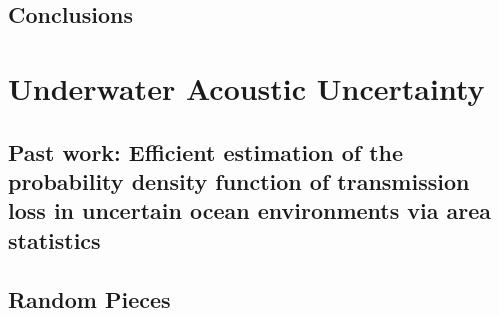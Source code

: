 \documentclass{./tex/thesis-umich}
\begin{document}
\acresetall

\chapter{Conclusions} \label{ch:usbe_conclusions}


\part{Underwater Acoustic Uncertainty} \label{part:uw_uncertainty}
\chapter{Past work: Efficient estimation of the probability density
  function of transmission loss in uncertain ocean environments via
  area statistics}
% 








\appendix
\begin{appendices}
  \chapter{Random Pieces}
  
  
  
  
  
  
  
  
  
  


\end{appendices}



%

\end{document}
